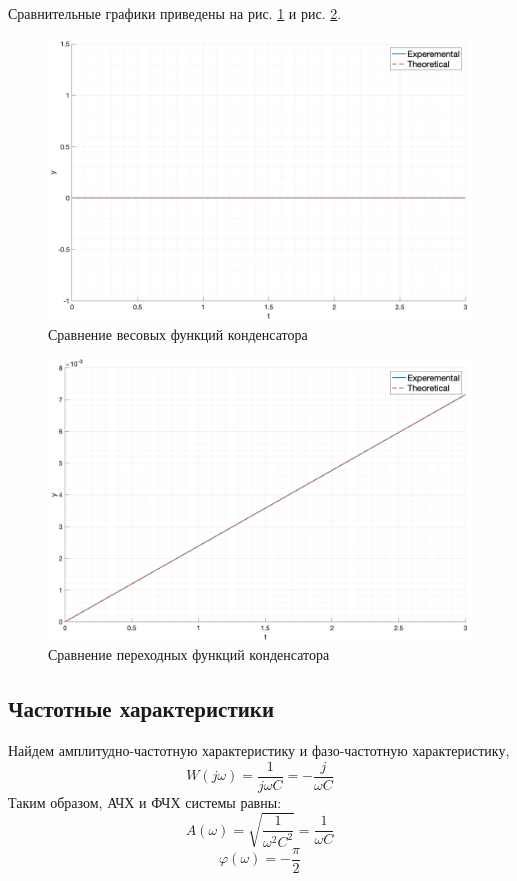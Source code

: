 Сравнительные графики приведены на рис. \ref{fig:task3_impulse_response_cmp} и рис. \ref{fig:task3_step_response_cmp}.
\begin{figure}[ht!]
    \centering
    \includegraphics[width=\textwidth]{media/plots/task3_impulse_response_cmp.png}
    \caption{Сравнение весовых функций конденсатора}
    \label{fig:task3_impulse_response_cmp}
\end{figure}
\begin{figure}[ht!]
    \centering
    \includegraphics[width=\textwidth]{media/plots/task3_step_response_cmp.png}
    \caption{Сравнение переходных функций конденсатора}
    \label{fig:task3_step_response_cmp}
\end{figure}

\FloatBarrier
\subsection{Частотные характеристики}
\noindent Найдем амплитудно-частотную характеристику и фазо-частотную характеристику,
\begin{equation}
    W(j\omega) = \frac{1}{j\omega C} = -\frac{j}{\omega C}
\end{equation}
Таким образом, АЧХ и ФЧХ системы равны:
\begin{equation}
    A(\omega) = \sqrt{\frac{1}{\omega^2C^2}} = \frac{1}{\omega C}
\end{equation}
\begin{equation}
    \varphi(\omega) = -\frac{\pi}{2}
\end{equation}

